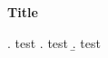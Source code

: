 \documentclass[12pt]{article}
\begin{document}
\begin{center}
\bf Title
\end{center}

 \lipsum[1]

\ex. test
\a. test
\b. test

\noindent  \lipsum[2-3]







\end{document}
